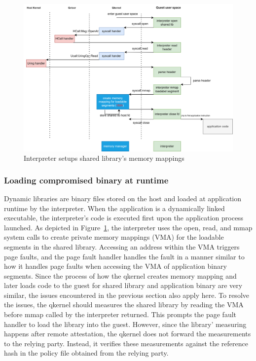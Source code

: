 \begin{figure}[H]
  \centering
  \includegraphics[width=1\textwidth]{images/load_shared_libarart.png}
  \caption[Interpreter setups shared library's memory mappings]{Interpreter setups shared library's memory mappings}
  \label{fig:load_shared_libarart}
\end{figure}


\subsubsection{Loading compromised binary at runtime}

Dynamic libraries are binary files stored on the host and loaded at application runtime by the interpreter. When the application is a dynamically linked executable, the interpreter's code is executed first upon the application process launched.  
As depicted in Figure~\ref{fig:load_shared_libarart}, the interpreter uses the open, read, and mmap system calls to create private memory mappings (VMA) for the loadable segments in the shared library.  Accessing an address within the VMA triggers 
page faults, and the page fault handler handles the fault in a manner similar to how it handles page faults when accessing the VMA of application binary segments.   Since the process of how the qkernel creates memory mapping and later loads code to 
the guest for shared library and application binary are very similar, the issues encountered in the previous section also apply here. To resolve the issues, the qkernel should measures the shared library by reading the VMA before mmap called by the interpreter 
returned. This prompts the page fault handler to load the library into the guest. However, since the library’ measuring happens after remote attestation, the qkernel does not forward the measurements to the relying party. Instead, it 
verifies these measurements against the reference hash in the policy file obtained from the relying party.


